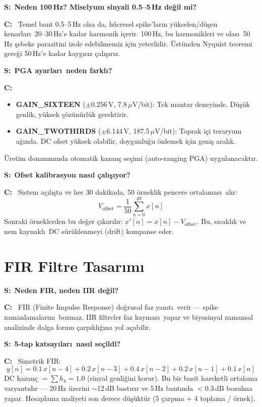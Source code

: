 \documentclass[11pt,a4paper]{article}
\newcommand{\soru}[1]{\vskip12pt\noindent\textcolor{ember}{\textbf{S:}}~\textbf{#1}\par\vskip4pt\noindent\textcolor{myco}{\textbf{C:}}~}
\begin{document}
\soru{Neden 100\,Hz? Miselyum sinyali 0.5--5\,Hz de\u{g}il mi?}
Temel bant 0.5--5\,Hz olsa da, hücresel spike'lar\i n y\"ukselen/d\"u\c{s}en kenarlar\i\ 20--30\,Hz'e kadar harmonik i\c{c}erir. 100\,Hz, bu harmonikleri ve olas\i\ 50\,Hz \c{s}ebeke parazitini izole edebilmemiz i\c{c}in yeterlidir. \"Ust\"unden Nyquist teoremi gere\u{g}i 50\,Hz'e kadar kayg\i s\i z \c{c}al\i\c{s}\i r\i z.

\soru{PGA ayarlar\i\ neden farkl\i?}
\begin{itemize}[leftmargin=1.2cm]
  \item \textbf{GAIN\_SIXTEEN} ($\pm$0.256\,V, 7.8\,$\mu$V/bit): Tek mantar deneyinde. D\"u\c{s}\"uk genlik, y\"uksek \c{c}\"oz\"un\"url\"uk gerektirir.
  \item \textbf{GAIN\_TWOTHIRDS} ($\pm$6.144\,V, 187.5\,$\mu$V/bit): Toprak i\c{c}i teraryum a\u{g}\i nda. DC ofset y\"uksek olabilir, doygunlu\u{g}u \"onlemek i\c{c}in geni\c{s} aral\i k.
\end{itemize}
\"Uretim donan\i m\i nda otomatik kazan\c{c} se\c{c}imi (auto-ranging PGA) uygulanacakt\i r.

\soru{Ofset kalibrasyon nas\i l \c{c}al\i\c{s}\i yor?}
Sistem a\c{c}\i l\i\c{s}ta ve her 30 dakikada, 50 \"orneklik pencere ortalamas\i\ al\i r:
\[
  V_{\mathrm{offset}} = \frac{1}{50}\sum_{n=0}^{49} x[n]
\]
Sonraki \"orneklerden bu de\u{g}er \c{c}\i kar\i l\i r: $x'[n] = x[n] - V_{\mathrm{offset}}$. Bu, s\i cakl\i k ve nem kaynakl\i\ DC s\"ur\"uklenmeyi (drift) kompanse eder.

\section{FIR Filtre Tasar\i m\i}

\soru{Neden FIR, neden IIR de\u{g}il?}
FIR (Finite Impulse Response) do\u{g}rusal faz yan\i t\i\ verir --- spike zamanlamalar\i n\i\ bozmaz. IIR filtreler faz kaymas\i\ yapar ve biyosinyal zamansal analizinde dalga formu \c{c}arp\i kl\i\u{g}\i na yol a\c{c}abilir.

\soru{5-tap katsay\i lar\i\ nas\i l se\c{c}ildi?}
Simetrik FIR:
\[
  y[n] = 0.1\,x[n\!-\!4] + 0.2\,x[n\!-\!3] + 0.4\,x[n\!-\!2] + 0.2\,x[n\!-\!1] + 0.1\,x[n]
\]
DC kazan\c{c} $= \sum h_k = 1.0$ (sinyal genli\u{g}ini korur). Bu bir basit hareketli ortalama varyant\i d\i r --- 20\,Hz \"uzerini $\sim$12\,dB bast\i r\i r ve 5\,Hz bant\i nda $<$0.3\,dB bozulma yapar. Hesaplama maliyeti son derece d\"u\c{s}\"ukt\"ur (5 \c{c}arpma + 4 toplama / \"ornek).
\end{document}
